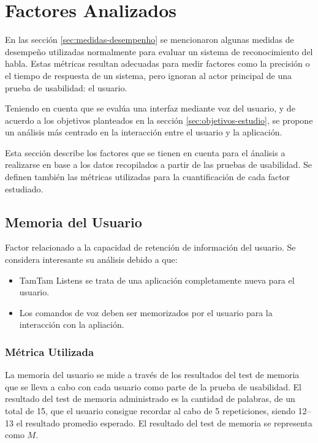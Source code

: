 \section{Factores Analizados}
\label{sec:factores}

En las secci\'on \ref{sec:medidas-desempenho} se mencionaron algunas medidas de desempe\~no 
utilizadas normalmente para evaluar un sistema de reconocimiento del habla. Estas m\'etricas
resultan adecuadas para medir factores como la precisi\'on o el tiempo de respuesta de un
sistema, pero ignoran al actor principal de una prueba de usabilidad: el usuario.

Teniendo en cuenta que se eval\'ua una interfaz mediante voz del usuario, y de acuerdo a los
objetivos planteados en la secci\'on \ref{sec:objetivos-estudio}, se propone un an\'alisis m\'as
centrado en la interacci\'on entre el usuario y la aplicaci\'on.

Esta secci\'on describe los factores que se tienen en cuenta para el \'analisis a realizarse
en base a los datos recopilados a partir de las pruebas de usabilidad.
Se definen tambi\'en las m\'etricas utilizadas para la cuantificaci\'on de cada factor estudiado.

\subsection{Memoria del Usuario}
\label{sec:memoria-del-usuario}
Factor relacionado a la capacidad de retenci\'on de informaci\'on del usuario.
Se considera interesante su an\'alisis debido a que:
\begin{itemize}
	\item TamTam Listens se trata de una aplicaci\'on completamente nueva para el usuario.
	\item Los comandos de voz deben ser memorizados por el usuario para la interacci\'on con
	la apliaci\'on.
\end{itemize}
\subsubsection{M\'etrica Utilizada}
La memoria del usuario se mide a trav\'es de los resultados del test de memoria que se lleva
a cabo con cada usuario como parte de la prueba de usabilidad.
El resultado del test de memoria administrado es la cantidad de palabras, de un total de 15,
que el usuario consigue recordar al cabo de 5 repeticiones, siendo 12--13 el resultado promedio
esperado. El resultado del test de memoria se representa como $M$.

